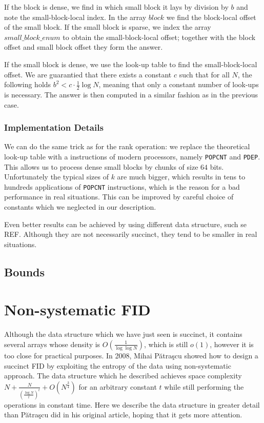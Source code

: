 If the block is dense, we find in which small block it lays by division by $b$ and note the small-block-local index.
In the array $block$ we find the block-local offset of the small block.
If the small block is sparse, we index the array $small\_block\_enum$ to obtain the small-block-local offset; together with the block offset and small block offset they form the answer.

If the small block is dense, we use the look-up table to find the small-block-local offset.
We are guarantied that there exists a constant $c$ such that for all $N$, the following holds $b^2 < c \cdot \frac{1}{2} \log N$, meaning that only a constant number of look-ups is necessary.
The answer is then computed in a similar fashion as in the previous case.

\subsubsection{Implementation Details}

We can do the same trick as for the rank operation: we replace the theoretical look-up table with a instructions of modern processors, namely \verb|POPCNT| and \verb|PDEP|.
This allows us to process dense small blocks by chunks of size $64$ bits.
Unfortunately the typical sizes of $k$ are much bigger, which results in tens to hundreds applications of \verb|POPCNT| instructions, which is the reason for a bad performance in real situations.
This can be improved by careful choice of constants which we neglected in our description.

Even better results can be achieved by using different data structure, such se REF.
Although they are not necessarily succinct, they tend to be smaller in real situations.

\subsection{Bounds}

\section{Non-systematic FID}
	
Although the data structure which we have just seen is succinct, it contains several arrays whose density is $O(\frac{1}{\log \log N})$, which is still $o(1)$, however it is too close for practical purposes.
In 2008, Mihai Pătraşcu showed how to design a succinct FID by exploiting the entropy of the data using non-systematic approach.
The data structure which he described achieves space complexity $N + \frac{N}{\left(\frac{\log N}{t}\right)^t} + O(N^\frac{3}{4})$ for an arbitrary constant $t$ while still performing the operations in constant time.
Here we describe the data structure in greater detail than Pătraşcu did in his original article, hoping that it gets more attention.

